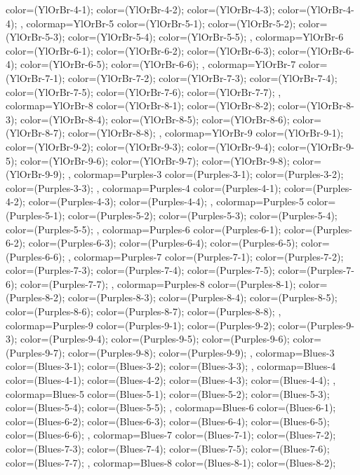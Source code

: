 {{color=(YlOrBr-4-1);
color=(YlOrBr-4-2);
color=(YlOrBr-4-3);
color=(YlOrBr-4-4);
},
colormap={YlOrBr-5}{
color=(YlOrBr-5-1);
color=(YlOrBr-5-2);
color=(YlOrBr-5-3);
color=(YlOrBr-5-4);
color=(YlOrBr-5-5);
},
colormap={YlOrBr-6}{
color=(YlOrBr-6-1);
color=(YlOrBr-6-2);
color=(YlOrBr-6-3);
color=(YlOrBr-6-4);
color=(YlOrBr-6-5);
color=(YlOrBr-6-6);
},
colormap={YlOrBr-7}{
color=(YlOrBr-7-1);
color=(YlOrBr-7-2);
color=(YlOrBr-7-3);
color=(YlOrBr-7-4);
color=(YlOrBr-7-5);
color=(YlOrBr-7-6);
color=(YlOrBr-7-7);
},
colormap={YlOrBr-8}{
color=(YlOrBr-8-1);
color=(YlOrBr-8-2);
color=(YlOrBr-8-3);
color=(YlOrBr-8-4);
color=(YlOrBr-8-5);
color=(YlOrBr-8-6);
color=(YlOrBr-8-7);
color=(YlOrBr-8-8);
},
colormap={YlOrBr-9}{
color=(YlOrBr-9-1);
color=(YlOrBr-9-2);
color=(YlOrBr-9-3);
color=(YlOrBr-9-4);
color=(YlOrBr-9-5);
color=(YlOrBr-9-6);
color=(YlOrBr-9-7);
color=(YlOrBr-9-8);
color=(YlOrBr-9-9);
},
colormap={Purples-3}{
color=(Purples-3-1);
color=(Purples-3-2);
color=(Purples-3-3);
},
colormap={Purples-4}{
color=(Purples-4-1);
color=(Purples-4-2);
color=(Purples-4-3);
color=(Purples-4-4);
},
colormap={Purples-5}{
color=(Purples-5-1);
color=(Purples-5-2);
color=(Purples-5-3);
color=(Purples-5-4);
color=(Purples-5-5);
},
colormap={Purples-6}{
color=(Purples-6-1);
color=(Purples-6-2);
color=(Purples-6-3);
color=(Purples-6-4);
color=(Purples-6-5);
color=(Purples-6-6);
},
colormap={Purples-7}{
color=(Purples-7-1);
color=(Purples-7-2);
color=(Purples-7-3);
color=(Purples-7-4);
color=(Purples-7-5);
color=(Purples-7-6);
color=(Purples-7-7);
},
colormap={Purples-8}{
color=(Purples-8-1);
color=(Purples-8-2);
color=(Purples-8-3);
color=(Purples-8-4);
color=(Purples-8-5);
color=(Purples-8-6);
color=(Purples-8-7);
color=(Purples-8-8);
},
colormap={Purples-9}{
color=(Purples-9-1);
color=(Purples-9-2);
color=(Purples-9-3);
color=(Purples-9-4);
color=(Purples-9-5);
color=(Purples-9-6);
color=(Purples-9-7);
color=(Purples-9-8);
color=(Purples-9-9);
},
colormap={Blues-3}{
color=(Blues-3-1);
color=(Blues-3-2);
color=(Blues-3-3);
},
colormap={Blues-4}{
color=(Blues-4-1);
color=(Blues-4-2);
color=(Blues-4-3);
color=(Blues-4-4);
},
colormap={Blues-5}{
color=(Blues-5-1);
color=(Blues-5-2);
color=(Blues-5-3);
color=(Blues-5-4);
color=(Blues-5-5);
},
colormap={Blues-6}{
color=(Blues-6-1);
color=(Blues-6-2);
color=(Blues-6-3);
color=(Blues-6-4);
color=(Blues-6-5);
color=(Blues-6-6);
},
colormap={Blues-7}{
color=(Blues-7-1);
color=(Blues-7-2);
color=(Blues-7-3);
color=(Blues-7-4);
color=(Blues-7-5);
color=(Blues-7-6);
color=(Blues-7-7);
},
colormap={Blues-8}{
color=(Blues-8-1);
color=(Blues-8-2);
}}
